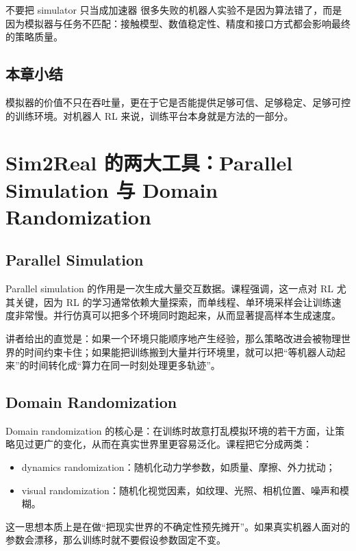 \documentclass[a4paper]{article}
\begin{document}
\begin{warningbox}{不要把 simulator 只当成加速器}
很多失败的机器人实验不是因为算法错了，而是因为模拟器与任务不匹配：接触模型、数值稳定性、精度和接口方式都会影响最终的策略质量。
\end{warningbox}

\subsection{本章小结}

模拟器的价值不只在吞吐量，更在于它是否能提供足够可信、足够稳定、足够可控的训练环境。对机器人 RL 来说，训练平台本身就是方法的一部分。

\section{Sim2Real 的两大工具：Parallel Simulation 与 Domain Randomization}

\subsection{Parallel Simulation}

Parallel simulation 的作用是一次生成大量交互数据。课程强调，这一点对 RL 尤其关键，因为 RL 的学习通常依赖大量探索，而单线程、单环境采样会让训练速度非常慢。并行仿真可以把多个环境同时跑起来，从而显著提高样本生成速度。

讲者给出的直觉是：如果一个环境只能顺序地产生经验，那么策略改进会被物理世界的时间约束卡住；如果能把训练搬到大量并行环境里，就可以把“等机器人动起来”的时间转化成“算力在同一时刻处理更多轨迹”。

\subsection{Domain Randomization}

Domain randomization 的核心是：在训练时故意打乱模拟环境的若干方面，让策略见过更广的变化，从而在真实世界里更容易泛化。课程把它分成两类：
\begin{itemize}
  \item dynamics randomization：随机化动力学参数，如质量、摩擦、外力扰动；
  \item visual randomization：随机化视觉因素，如纹理、光照、相机位置、噪声和模糊。
\end{itemize}

这一思想本质上是在做“把现实世界的不确定性预先摊开”。如果真实机器人面对的参数会漂移，那么训练时就不要假设参数固定不变。
\end{document}
